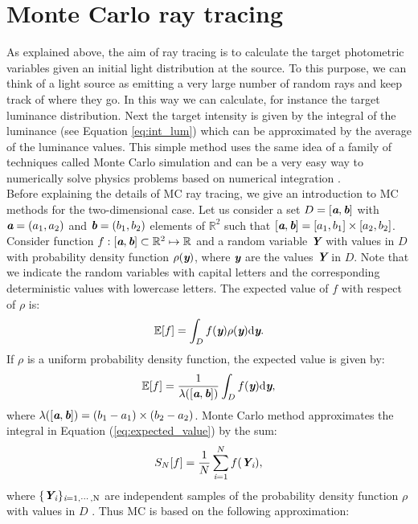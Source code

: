 \section{Monte Carlo ray tracing}
As explained above, the aim of ray tracing is to calculate the target photometric variables given an initial light distribution at the source. To this purpose, we can think of a light source as
emitting a very large number of random rays and keep track of where they go. In this way we can calculate, for instance the target luminance distribution. Next the target intensity is given by the integral of the luminance (see Equation \ref{eq:int_lum}) which can be approximated by the average of the luminance values. This simple method uses the same idea of a family of techniques called Monte Carlo simulation and can be a very easy way to numerically
solve physics problems based on numerical integration \cite{jensen2003monte}.
\\ \indent Before explaining the details of MC ray tracing, we give an introduction to MC methods for the two-dimensional case. Let us consider a set $D = [\textit{\textbf{a}}, \textit{\textbf{b}}]$ with $\textit{\textbf{a}} = (a_1, a_2)$ and $\textit{\textbf{b}} = (b_1, b_2)$ elements of $\mathbb{R}^2$ such that
$[\textit{\textbf{a}}, \textit{\textbf{b}}]  = [a_1, b_1] \times [a_2, b_2]$. Consider function $f:[\textit{\textbf{a}},\textit{\textbf{b}}]\subset \mathbb{R}^2 \mapsto \mathbb{R}$ and a random variable 
$\textit{\textbf{Y}}$ with values in $D$ with probability density function $\rho(\textit{\textbf{y}})$, where $\textit{\textbf{y}}$ are the values $\textit{\textbf{Y}}$ in $D$. Note that we indicate the random variables with capital letters and the corresponding deterministic values with lowercase letters. The expected value of $f$ with respect of $\rho$ is:
\begin{equation}
\mathbb{E}[f] =\int_{D}f(\textit{\textbf{y}})\rho(\textit{\textbf{y}}) \textrm{d}\textit{\textbf{y}}.
\end{equation}
If $\rho$ is a uniform probability density function, the expected value is given by:
\begin{equation}\label{eq:expected_value}
\mathbb{E}[f] =\frac{1}{\lambda([\textit{\textbf{a}},\textit{\textbf{b}}])} \int_{D}f(\textit{\textbf{y}}) \textrm{d}\textit{\textbf{y}},
\end{equation}
where $\lambda([\textit{\textbf{a}},\textit{\textbf{b}}]) = (b_1-a_1)\times (b_2-a_2)$.
Monte Carlo method approximates the integral in Equation (\ref{eq:expected_value}) by the sum:
\begin{equation}
S_{N}[f] = \frac{1}{N} \sum_{\textit{i}=1}^{N} f(\textit{\textbf{Y}}_{\textit{i}}),
\end{equation}
where $\{\textit{\textbf{Y}}_{\textit{i}}\}_{\textit{i} = 1, \cdots, \textrm{N}}$ are independent samples of the probability density function $\rho$ with values in $D$ \cite{owen2003quasi}. Thus MC is based on the following approximation:
